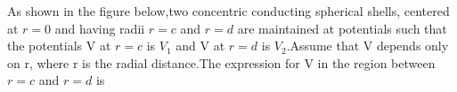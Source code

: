 \iffalse
    \title{Assignment}
    \author{EE24BTECH11039}
    \section{ee}
    \chapter{2022}
  \fi
\item As shown in the figure below,two concentric conducting spherical shells, centered at $r=0 $ and having radii  $r=c$ and $r=d $ are maintained at potentials such that the potentials V at $r=c$ is $V_1$ and V at $r =d$ is $V_2$.Assume that V depends only on r, where r is the radial distance.The expression for V in the region between $r=c$ and $r=d$ is 

\begin{figure}[h]
\centering
{}%
\end{figure}

